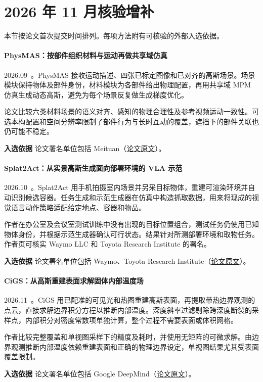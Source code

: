 \section{2026 年 11 月核验增补}

本节按论文首次提交时间排列。每项方法附有可核验的外部入选依据。

\paragraph{PhysMAS：按部件组织材料与运动再做共享域仿真}
2026.09~\cite{2609_07174}。PhysMAS 接收运动描述、四张已标定图像和已对齐的高斯场景。场景模块保持物体及部件身份，材料模块为各部件给出物理配置，再用共享域 MPM 仿真生成动态高斯，避免为每个场景反复做生成梯度优化。

论文比较六类材料场景的语义对齐、感知的物理合理性及参考视频运动一致性。可选本构配置和空间分辨率限制了部件行为与长时互动的覆盖，遮挡下的部件关联也仍可能不稳定。

\textbf{入选依据} 论文署名单位包括 Meituan（\href{https://arxiv.org/abs/2609.07174}{论文原文}）。

\paragraph{Splat2Act：从实景高斯生成面向部署环境的 VLA 示范}
2026.10~\cite{2610_13945}。Splat2Act 用手机拍摄室内场景并另采目标物体，重建可渲染环境并自动识别候选容器。任务生成和示范生成器在仿真中构造抓取数据，用来将现成的视觉语言动作策略适配给定地点、容器和物品。

作者在办公室及会议室测试训练中没有出现的目标位置组合，测试任务仍使用已知物体身份，并根据示范生成器确认可行状态。结果针对所测部署环境和取物任务。作者页可核实 Waymo LLC 和 Toyota Research Institute 的署名。

\textbf{入选依据} 论文署名单位包括 Waymo、Toyota Research Institute（\href{https://arxiv.org/html/2610.13945v1}{论文原文}）。

\paragraph{CiGS：从高斯重建表面求解固体内部温度场}
2026.11~\cite{2611_20283}。CiGS 用已配准的可见光和热图重建高斯表面，再提取带热边界观测的点云，直接求解边界积分方程以推断内部温度。深度斜率过滤剔除跨深度断裂的采样点，内部积分对密度常数项单独计算，整个过程不需要表面或体积网格。

作者比较完整覆盖和单视图采样下的精度及耗时，并使用无矩阵的可微求解。由边界观测推断内部温度依赖重建表面和正确的物理边界设定，单视图结果尤其受表面覆盖限制。

\textbf{入选依据} 论文署名单位包括 Google DeepMind（\href{https://arxiv.org/abs/2611.20283}{论文原文}）。
